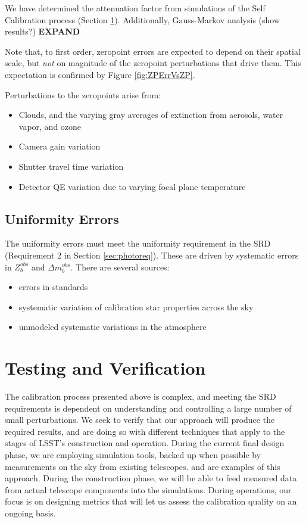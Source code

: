 \documentclass[12pt,preprint]{aastex}
\begin{document}
We have determined the attenuation factor from simulations of the Self Calibration process (Section \ref{sec:verification}).   Additionally, Gauss-Markov analysis (show results?) {\bf EXPAND }

Note that, to first order, zeropoint errors are expected to depend on their spatial scale, but {\it not} on magnitude of the zeropoint
perturbations that drive them.  This expectation is confirmed by Figure \ref{fig:ZPErrVsZP}.

Perturbations to the zeropoints arise from:
\begin{itemize}
\item{Clouds, and the varying gray averages of extinction from aerosols, water vapor, and ozone}
\item{Camera gain variation}
\item{Shutter travel time variation}
\item{Detector QE variation due to varying focal plane temperature}
\end{itemize}

\subsection{Uniformity Errors}
The uniformity errors must meet the uniformity requirement in the SRD (Requirement 2 in Section \ref{sec:photoreq}).  These are driven by systematic errors in $Z_b^{obs}$ and $\Delta m_b^{obs}$.  There are several sources:
\begin{itemize}
\item{errors in standards}
\item{systematic variation of calibration star properties across the sky}
\item{unmodeled systematic variations in the atmosphere}
\end{itemize}



\section{Testing and Verification}
\label{sec:verification}

The calibration process presented above is complex, and meeting the SRD requirements
is dependent on understanding and controlling a large number of small perturbations.  We seek to verify that our approach will produce the required results, and are doing so with different techniques that apply to the stages of LSST's construction and operation.   During the current final design phase, we are employing simulation tools, backed up when possible by measurements on the sky from existing telescopes.   \citep{Burke2013} and \citep{Burke2010b} are examples of this approach.  During the construction phase, we will be able to feed measured data from actual telescope components into the simulations.   During operations, our focus is on designing metrics that will let us assess the calibration quality on an ongoing basis.
\end{document}
